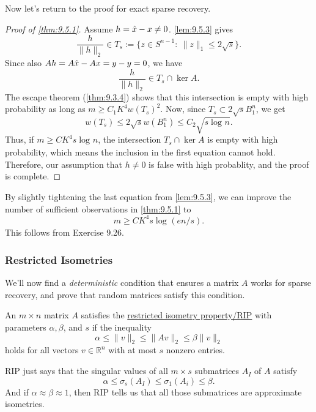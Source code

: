 Now let's return to the proof for exact sparse recovery.
\begin{proof}[Proof of \cref{thm:9.5.1}]
Assume $h = \Hat{x} - x \neq 0$. \cref{lem:9.5.3} gives 
\[ \frac{h}{\lVert h \rVert_{2}} \in T_s := \{ z \in S^{n-1}: \ \lVert z \rVert_{1} \leq 2 \sqrt{s} \}. \]
Since also $Ah = A \Hat{x} - Ax = y - y = 0$, we have 
\[ \frac{h}{\lVert h \rVert_{2}} \in T_s \cap \ker{A}. \]
The escape theorem (\cref{thm:9.3.4}) shows that this intersection is empty with high probability as long as 
$m \geq C_1 K^4w(T_s)^2$. Now, since $T_s \subset 2 \sqrt{s}B_1^n$, we get
\[ w(T_s) \leq 2 \sqrt{s} w(B_1^n) \leq C_2 \sqrt{s \log_{}{n}}. \]
Thus, if $m \geq CK^4s \log_{}{n}$, the intersection $T_s \cap \ker{A}$ is empty with high probability, which 
means the inclusion in the first equation cannot hold. Therefore, our assumption that $h \neq 0$ is false 
with high probablity, and the proof is complete.
\end{proof}

\begin{remark}
\label{rmk:9.5.4}
By slightly tightening the last equation from \cref{lem:9.5.3}, we can improve the number of sufficient 
observations in \cref{thm:9.5.1} to
\[ m \geq CK^4 s \log_{}{(en/s)}. \]
This follows from Exercise 9.26.
\end{remark}


\subsubsection{Restricted Isometries}
We'll now find a \textit{deterministic} condition that ensures a matrix $A$ works for sparse recovery, and 
prove that random matrices satisfy this condition. 

\begin{definition}[]
\label{def:9.5.5} 
An $m \times n$ matrix $A$ satisfies the \underline{restricted isometry property/RIP} with 
parameters $\alpha, \beta$, and $s$ if the inequality
\[ \alpha \leq \lVert v \rVert_{2} \leq \lVert Av \rVert_{2} \leq \beta \lVert v \rVert_{2} \]
holds for all vectors $v \in \mathbb{R}^n$ with at most $s$ nonzero entries.
\end{definition}

RIP just says that the singular values of all $m \times s$ submatrices $A_I$ of $A$ satisfy 
\[ \alpha \leq \sigma_s(A_I) \leq \sigma_1(A_i) \leq \beta. \]
And if $\alpha \approx \beta \approx 1$, then RIP tells us that all those submatrices are approximate 
isometries.

